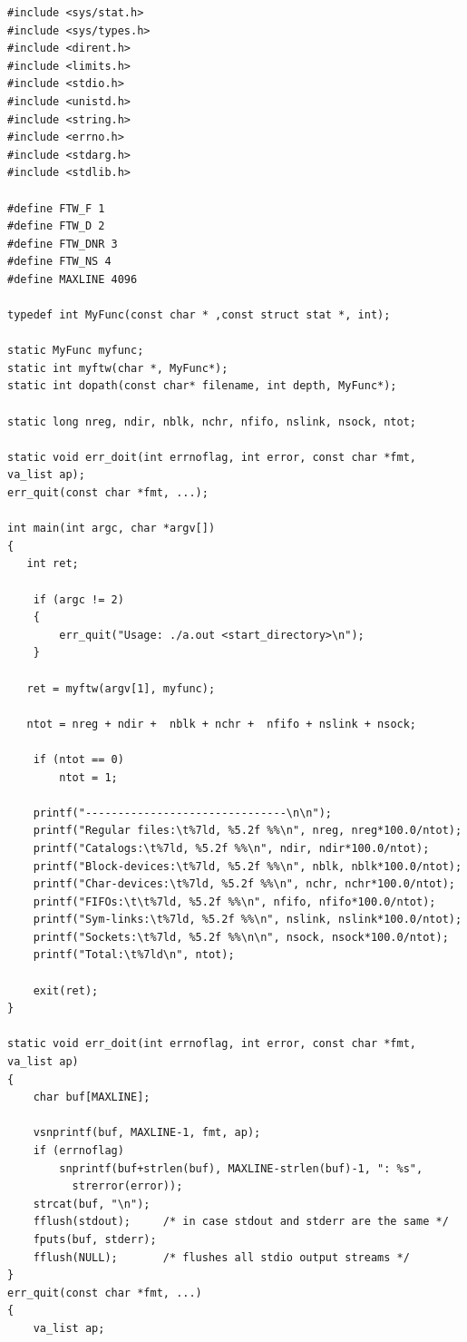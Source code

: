 \lstset{language=c}
\begin{lstlisting}[caption=Текст программы]
#include <sys/stat.h>
#include <sys/types.h>
#include <dirent.h>
#include <limits.h>
#include <stdio.h>
#include <unistd.h>
#include <string.h>
#include <errno.h>
#include <stdarg.h>
#include <stdlib.h>

#define FTW_F 1
#define FTW_D 2
#define FTW_DNR 3
#define FTW_NS 4
#define	MAXLINE	4096

typedef int MyFunc(const char * ,const struct stat *, int);

static MyFunc myfunc;
static int myftw(char *, MyFunc*);
static int dopath(const char* filename, int depth, MyFunc*);

static long nreg, ndir, nblk, nchr, nfifo, nslink, nsock, ntot;

static void err_doit(int errnoflag, int error, const char *fmt, va_list ap);
err_quit(const char *fmt, ...);

int main(int argc, char *argv[])
{
   int ret;

	if (argc != 2)
	{
		err_quit("Usage: ./a.out <start_directory>\n");
	}

   ret = myftw(argv[1], myfunc);

   ntot = nreg + ndir +  nblk + nchr +  nfifo + nslink + nsock;

    if (ntot == 0)
		ntot = 1;

	printf("-------------------------------\n\n");
	printf("Regular files:\t%7ld, %5.2f %%\n", nreg, nreg*100.0/ntot);
	printf("Catalogs:\t%7ld, %5.2f %%\n", ndir, ndir*100.0/ntot);
	printf("Block-devices:\t%7ld, %5.2f %%\n", nblk, nblk*100.0/ntot);
	printf("Char-devices:\t%7ld, %5.2f %%\n", nchr, nchr*100.0/ntot);
	printf("FIFOs:\t\t%7ld, %5.2f %%\n", nfifo, nfifo*100.0/ntot);
	printf("Sym-links:\t%7ld, %5.2f %%\n", nslink, nslink*100.0/ntot);
	printf("Sockets:\t%7ld, %5.2f %%\n\n", nsock, nsock*100.0/ntot);
    printf("Total:\t%7ld\n", ntot);

    exit(ret);
}

static void err_doit(int errnoflag, int error, const char *fmt, va_list ap)
{
	char buf[MAXLINE];

	vsnprintf(buf, MAXLINE-1, fmt, ap);
	if (errnoflag)
		snprintf(buf+strlen(buf), MAXLINE-strlen(buf)-1, ": %s",
		  strerror(error));
	strcat(buf, "\n");
	fflush(stdout);		/* in case stdout and stderr are the same */
	fputs(buf, stderr);
	fflush(NULL);		/* flushes all stdio output streams */
}
err_quit(const char *fmt, ...)
{
	va_list ap;


\end{lstlisting}
